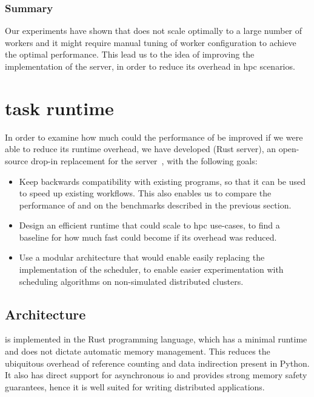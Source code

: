 \subsubsection*{Summary}
Our experiments have shown that \dask{} does not scale optimally to a large
number of workers and it might require manual tuning of worker configuration to achieve the optimal
performance. This lead us to the idea of improving the implementation of the
\dask{} server, in order to reduce its overhead in \gls{hpc}
scenarios.

\section{\rsds{} task runtime}
\label{sec:rsds-description}
In order to examine how much could the performance of \dask{} be improved if we
were able to reduce its runtime overhead, we have developed \rsds{} (Rust \dask{} server), an
open-source drop-in replacement for the \dask{}
server~\cite{rsds_github}, with the following goals:

\begin{itemize}
	\item Keep backwards compatibility with existing \dask{} programs, so that it can be
	      used to speed up existing workflows. This also enables us to compare the performance of
	      \rsds{} and \dask{} on the benchmarks described in the
	      previous section.
	\item Design an efficient runtime that could scale to \gls{hpc} use-cases, to find a
	      baseline for how much fast could \dask{} become if its overhead was reduced.
	\item Use a modular architecture that would enable easily replacing the implementation of the scheduler,
	      to enable easier experimentation with scheduling algorithms on non-simulated distributed clusters.
\end{itemize}

\subsection*{Architecture}
\rsds{} is implemented in the Rust programming language, which has a minimal
runtime and does not dictate automatic memory management. This reduces the ubiquitous overhead of
reference counting and data indirection present in Python. It also has direct support for
asynchronous \gls{io} and provides strong memory safety guarantees, hence it is
well suited for writing distributed applications.

